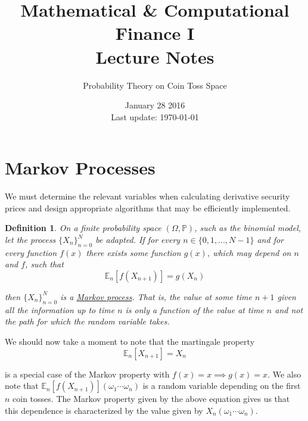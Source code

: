 \documentclass[12pt]{article}
\newtheorem{definition}{Definition}
\newlength\tindent
\renewcommand{\indent}{\hspace*{\tindent}}
\renewcommand{\P}{\mathbb P}
\newcommand{\E}{\mathbb E}
\begin{document}
 
 
\title{Mathematical \& Computational Finance I\\Lecture Notes}
\author{Probability Theory on Coin Toss Space}
\date{January 28 2016 \\ Last update: \today{}}
\maketitle

\section{Markov Processes}

\indent We must determine the relevant variables when calculating derivative security prices and design appropriate algorithms that may be efficiently implemented.

\begin{definition} On a finite probability space $(\Omega, \P)$, such as the binomial model, let the process $\{X_n\}^N_{n = 0}$ be adapted. If for every $n \in \{0,1,..., N - 1\}$ and for every function $f(x)$ there exists some function $g(x)$, which may depend on $n$ and $f$, such that
\begin{equation*}
	\E_n\left[ f(X_{n + 1}) \right] = g(X_n)
\end{equation*}

then $\{X_n\}^N_{n = 0}$ is a \underline{Markov process}. That is, the value at some time $n + 1$ given all the information up to time $n$ is only a function of the value at time $n$ and not the path for which the random variable takes.
\end{definition}

We should now take a moment to note that the martingale property
\begin{equation*}
	\E_n \left[X_{n + 1} \right] = X_n
\end{equation*}

is a special case of the Markov property with $f(x) = x \implies g(x) = x$. We also note that $\E_n \left[ f(X_{n + 1}) \right](\omega_1\cdots\omega_n)$ is a random variable depending on the first $n$ coin tosses. The Markov property given by the above equation gives us that this dependence is characterized by the value given by $X_n(\omega_1\cdots\omega_n)$. \\
\end{document}
